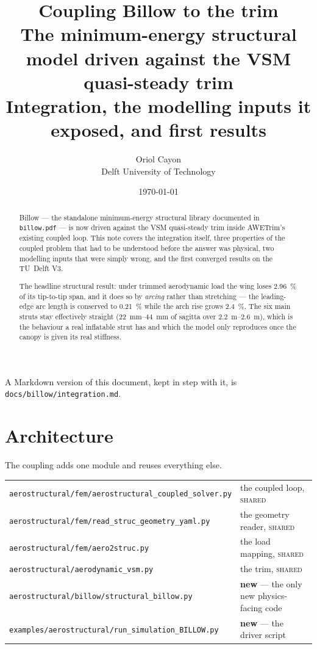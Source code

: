 \documentclass[11pt,a4paper]{article}
\title{%
  \vspace{-1.5cm}
  {\Huge\textbf{Coupling Billow to the trim}}\\[6pt]
  {\large The minimum-energy structural model driven against the VSM
   quasi-steady trim}\\[10pt]
  {\normalsize Integration, the modelling inputs it exposed, and first results}
}
\author{Oriol Cayon \\ \small Delft University of Technology}
\date{\today}
\newcommand{\code}[1]{\texttt{\small #1}}
\begin{document}
\maketitle
\thispagestyle{fancy}

\begin{abstract}
\noindent
Billow --- the standalone minimum-energy structural library documented in
\code{billow.pdf} --- is now driven against the VSM quasi-steady trim inside
AWETrim's existing coupled loop. This note covers the integration itself, three
properties of the coupled problem that had to be understood before the answer
was physical, two modelling inputs that were simply wrong, and the first
converged results on the TU~Delft V3.

The headline structural result: under trimmed aerodynamic load the wing loses
\SI{2.96}{\percent} of its tip-to-tip span, and it does so by \emph{arcing}
rather than stretching --- the leading-edge arc length is conserved to
\SI{0.21}{\percent} while the arch rise grows \SI{2.4}{\percent}. The six main
struts stay effectively straight (\SIrange{22}{44}{\milli\metre} of sagitta over
\SIrange{2.2}{2.6}{\metre}), which is the behaviour a real inflatable strut has
and which the model only reproduces once the canopy is given its real stiffness.
\end{abstract}

\vspace{0.4em}
\noindent\textcolor{muted}{\small A Markdown version of this document, kept in
step with it, is \code{docs/billow/integration.md}.}

\tableofcontents
\vspace{1em}

\section{Architecture}

The coupling adds one module and reuses everything else.

\begin{center}\small
\begin{tabular}{@{}ll@{}}
\toprule
\code{aerostructural/fem/aerostructural\_coupled\_solver.py} & the coupled loop, \textsc{shared} \\
\code{aerostructural/fem/read\_struc\_geometry\_yaml.py} & the geometry reader, \textsc{shared} \\
\code{aerostructural/fem/aero2struc.py} & the load mapping, \textsc{shared} \\
\code{aerostructural/aerodynamic\_vsm.py} & the trim, \textsc{shared} \\
\code{aerostructural/billow/structural\_billow.py} & \textbf{new} --- the only new physics-facing code \\
\code{examples/aerostructural/run\_simulation\_BILLOW.py} & \textbf{new} --- the driver script \\
\bottomrule
\end{tabular}
\end{center}
\end{document}
